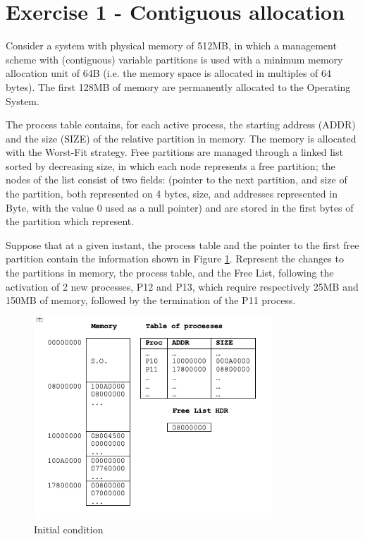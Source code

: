 \section{Exercise 1 - Contiguous allocation}

Consider a system with physical memory of 512MB, in which a management scheme with (contiguous) variable partitions is used with a minimum memory allocation unit of 64B (i.e. the memory space is allocated in multiples of 64 bytes). 
The first 128MB of memory are permanently allocated to the Operating System.

The process table contains, for each active process, the starting address (ADDR) and the size (SIZE) of the relative partition in memory. The memory is allocated with the Worst-Fit strategy. Free partitions are managed through a linked list sorted by decreasing size, in which each node represents a free partition; the nodes of the list consist of two fields: (pointer to the next partition, and size of the partition, both represented on 4 bytes, size, and addresses represented in Byte, with the value 0 used as a null pointer) and are stored in the first bytes of the partition which represent.

Suppose that at a given instant, the process table and the pointer to the first free partition contain the information shown in Figure \ref{fig:cont1}. Represent the changes to the partitions in memory, the process table, and the Free List, following the activation of 2 new processes, P12 and P13, which require respectively 25MB and 150MB of memory, followed by the termination of the P11 process.

\begin{figure}[hbt]
  \includegraphics[width=0.8\textwidth]{images/contiguosallocation1.png}
  \caption{Initial condition}
  \label{fig:cont1}
\end{figure}


